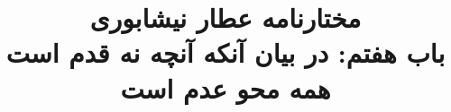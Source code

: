 \documentclass[14pt,b5paper]{article}
\begin{document}
\title{\Huge مختارنامه عطار نیشابوری \\
باب هفتم: در بیان آنکه آنچه نه قدم است همه محو عدم است}
\author{ }
\date{ }
\maketitle
\newpage
\tableofcontents
\newpage

\newpage

\newpage

\newpage

\newpage

\newpage

\newpage

\newpage

\newpage

\newpage

\newpage

\newpage

\newpage

\newpage

\newpage

\newpage

\newpage

\newpage

\newpage

\newpage

\newpage

\newpage

\newpage

\newpage

\newpage

\newpage

\newpage

\newpage

\newpage

\newpage

\newpage

\newpage

\newpage

\newpage

\newpage

\newpage

\newpage

\newpage

\newpage

\newpage

\newpage

\newpage

\newpage

\newpage

\newpage

\newpage

\newpage

\newpage
\end{document}
